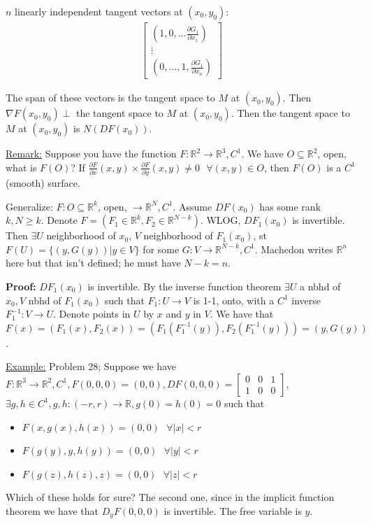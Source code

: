 \documentclass{article}
\newcommand*{\txt}[1]{\text{ #1 }}%
\newcommand*{\fora}{\txt{}\forall}%
\newcommand*{\rr}{\mathbb{R}}%
\newcommand*{\partials}[2]{\frac{\partial #1}{\partial #2}}%
\begin{document}
$n$ linearly independent tangent vectors at $(x_0,y_0)$:\begin{align*}
    \begin{bmatrix}
        (1,0,\dots\partials{G_1}{x_1})\\
        \vdots\\
        (0,\dots,1,\partials{G_1}{x_n})
    \end{bmatrix}
\end{align*}

The span of these vectors is the tangent space to $M$ at $(x_0,y_0)$. Then $\nabla F(x_0,y_0)\perp$ the tangent space to $M$ at $(x_0,y_0)$. Then the tangent space to $M$ at $(x_0,y_0)$ is $N(DF(x_0))$.

\underline{Remark:} Suppose you have the function $F:\rr^2\to \rr^3, C^1$.  We have $O\subseteq \rr^2$, open, what is $F(O)$? If $\partials{F}{x}(x,y)\times \partials{F}{y}(x,y)\neq 0\fora (x,y)\in O$, then $F(O)$ is a $C^1$ (smooth) surface. 

Generalize: $F:O\subseteq \rr^k$, open, $\to \rr^N, C^1$. Assume $DF(x_0)$ has some rank $k, N\geq k$. Denote $F=(F_1\in \rr^k, F_2\in \rr^{N-k})$. WLOG, $DF_1(x_0)$ is invertible. Then $\exists U$ neighborhood of $x_0$, $V$ neighborhood of $F_1(x_0)$, st $F(U)=\{(y,G(y))|y\in V\}$ for some $G:V\to \rr^{N-k}, C^1$. Machedon writes $\rr^n$ here but that isn't defined; he must have $N-k=n$.

\textbf{Proof:} $DF_1(x_0)$ is invertible. By the inverse function theorem $\exists U$ a nbhd of $x_0, V$ nbhd of $F_1(x_0)$ such that $F_1:U\to V$ is 1-1, onto, with a $C^1$ inverse $F_1^{-1}:V\to U$. Denote points in $U$ by $x$ and $y$ in $V$. We have that $F(x)=(F_1(x),F_2(x))=(F_1(F_1^{-1}(y)),F_2(F_1^{-1}(y)))=(y,G(y))$.

\underline{Example:} Problem 28; Suppose we have $F:\rr^3\to \rr^2, C^1, F(0,0,0)=(0,0),DF(0,0,0)=\begin{bmatrix}
    0 & 0 & 1\\
    1 & 0 & 0
\end{bmatrix}$, $\exists g,h\in C^1, g,h:(-r,r)\to \rr, g(0)=h(0)=0$ such that \begin{itemize}
    \item $F(x,g(x),h(x))=(0,0)\fora |x|<r$
    \item $F(g(y),y,h(y))=(0,0)\fora |y|<r$
    \item $F(g(z),h(z),z)=(0,0)\fora |z|<r$
\end{itemize}Which of these holds for sure? The second one, since in the implicit function theorem we have that $D_yF(0,0,0)$ is invertible. The free variable is $y$.
\end{document}
